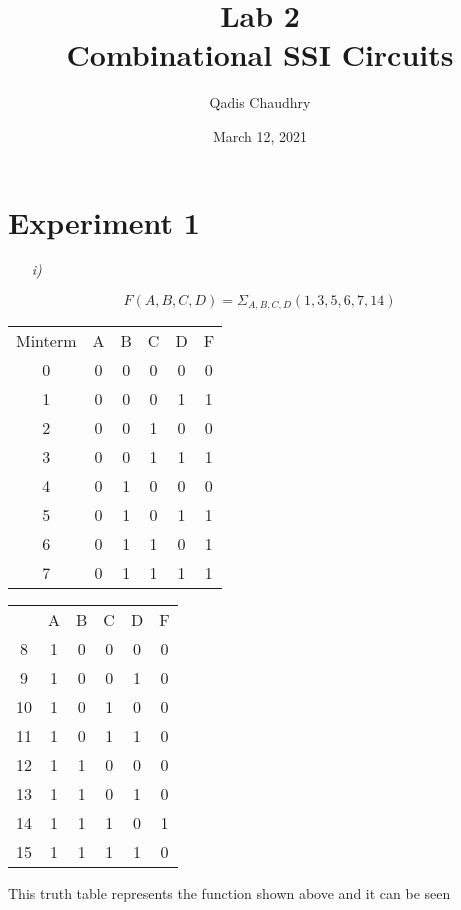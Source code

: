 \documentclass[12pt]{article}
\title{Lab 2 \\ Combinational SSI Circuits}
\author{Qadis Chaudhry}
\date{March 12, 2021}
\begin{document}
\maketitle
    \section*{Experiment 1}
    \begin{itemize}
        \item[\textit{i)}]
    \end{itemize}
    \[
        F\left(A,B,C,D\right) = \Sigma_{A,B,C,D}\left(1,3,5,6,7,14\right)
    \]
    \begin{center}
        \begin{tabular}{ccccc|c}
            Minterm & A & B & C & D & F \\
            \cmidrule{2-6}
            0 & 0 & 0 & 0 & 0 & 0 \\
            1 & 0 & 0 & 0 & 1 & 1 \\
            2 & 0 & 0 & 1 & 0 & 0 \\
            3 & 0 & 0 & 1 & 1 & 1 \\
            4 & 0 & 1 & 0 & 0 & 0 \\
            5 & 0 & 1 & 0 & 1 & 1 \\
            6 & 0 & 1 & 1 & 0 & 1 \\
            7 & 0 & 1 & 1 & 1 & 1 \\
        \end{tabular}
        \quad
        \begin{tabular}{ccccc|c}
            & A & B & C & D & F \\
            \cmidrule{2-6}
            8 & 1 & 0 & 0 & 0 & 0 \\
            9 & 1 & 0 & 0 & 1 & 0 \\
            10 & 1 & 0 & 1 & 0 & 0 \\
            11 & 1 & 0 & 1 & 1 & 0 \\
            12 & 1 & 1 & 0 & 0 & 0 \\
            13 & 1 & 1 & 0 & 1 & 0 \\
            14 & 1 & 1 & 1 & 0 & 1 \\
            15 & 1 & 1 & 1 & 1 & 0 \\
        \end{tabular}
    \end{center}
    \par This truth table represents the function shown above and it can be seen
\end{document}
